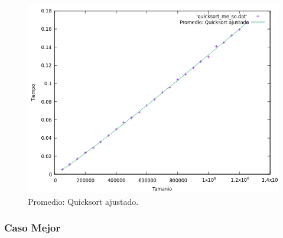 \documentclass[a4paper,12pt,twoside]{article} %
\begin{document}
\begin{itemize}
\begin{figure}[h]
\begin{center}
  	\includegraphics[scale=0.8]{quicksort_me_so_a.png}
  	\caption{Promedio: Quicksort ajustado.}
  	
  \end{center}
\end{figure}
		
	\end{itemize}
	\newpage
	
	\subsubsection{Caso Mejor}
	
\end{document}
